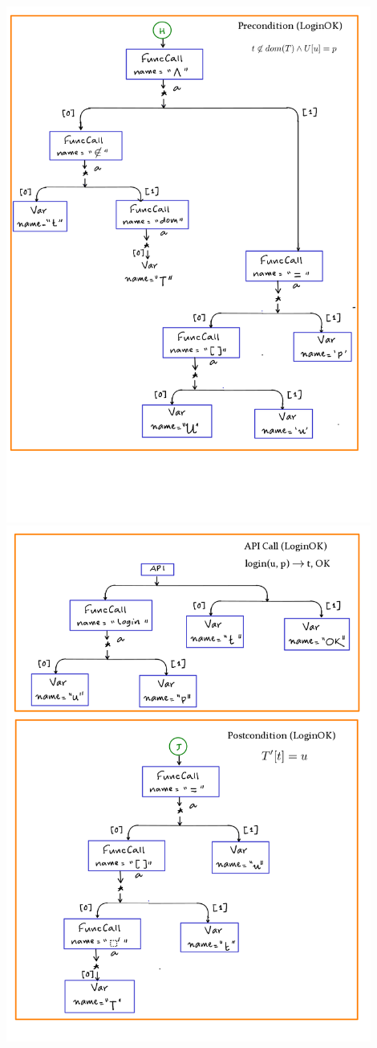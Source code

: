 \documentclass[12pts, a4paper]{article}
\begin{document}
\begin{center}
\includegraphics[width=0.9\textwidth]{images/spec-AST-7.png}
\includegraphics[width=0.9\textwidth]{images/spec-AST-8.png}
\end{center}
\end{document}

